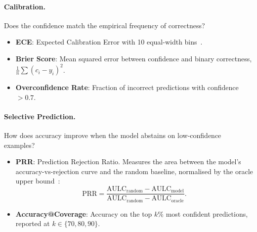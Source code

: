 \documentclass[11pt,a4paper]{article}
\begin{document}
\paragraph{Calibration.}
Does the confidence match the empirical frequency of correctness?

\begin{itemize}[nosep]
  \item \textbf{ECE}: Expected Calibration Error with 10 equal-width
        bins~\cite{naeini2015obtaining}.
  \item \textbf{Brier Score}: Mean squared error between confidence and
        binary correctness, $\frac{1}{n}\sum(c_i - y_i)^{2}$.
  \item \textbf{Overconfidence Rate}: Fraction of incorrect predictions
        with confidence $> 0.7$.
\end{itemize}

\paragraph{Selective Prediction.}
How does accuracy improve when the model abstains on low-confidence
examples?

\begin{itemize}[nosep]
  \item \textbf{PRR}: Prediction Rejection Ratio.  Measures the area
        between the model's accuracy-vs-rejection curve and the random
        baseline, normalised by the oracle upper
        bound~\cite{malinin2017predictive}:
        \begin{equation}
          \text{PRR} = \frac{\text{AULC}_{\text{random}} -
          \text{AULC}_{\text{model}}}{\text{AULC}_{\text{random}} -
          \text{AULC}_{\text{oracle}}}.
        \end{equation}
  \item \textbf{Accuracy@Coverage}: Accuracy on the top $k$\% most
        confident predictions, reported at $k \in \{70, 80, 90\}$.
\end{itemize}
\end{document}
